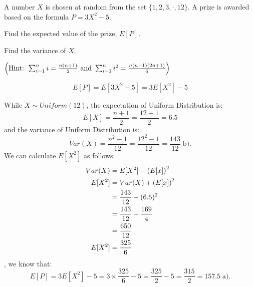 \documentclass[a4paper, 10pt]{article}
\begin{document}
\begin{tosubmit}
\problem[6]
A number \( X \) is chosen at random from the set \( \{1, 2, 3, \cdot , 12\} \).
A prize is awarded based on the formula \( P = 3X^2 - 5 \).
\begin{subproblems}
    \item Find the expected value of the prize, \( E[P] \).
    \item Find the variance of \( X \).
\end{subproblems}
\( \left(\text{Hint: } \sum_{i=1}^n i = \frac{n(n+1)}{2} \text{ and } \sum_{i=1}^n i^2 = \frac{n(n+1)(2n+1)}{6}\right) \)

\vspace{2mm}

\par\noindent\submitsolution
\[
    E[P] = E[3X^2 - 5] = 3E[X^2] - 5
\]

\vspace{2mm}

\par\noindent While \( X \sim Uniform(12) \), the expectation of Uniform Distribution is:
\[
    E[X] = \frac{n+1}{2} = \frac{12+1}{2} = 6.5
\]
and the variance of Uniform Distribution is:
\[
    Var(X) = \frac{n^2 - 1}{12} = \frac{12^2 - 1}{12} = \boxed{\frac{143}{12}} \; \text{b).}
\]
We can calculate \( E[X^2] \) as follows:
\begin{align*}    
    Var(X) &= E[X^2] - \left(E[x]\right)^2 \\
    E[X^2] &= Var(X) + \left(E[x]\right)^2 \\
    &= \frac{143}{12} + (6.5)^2 \\
    &= \frac{143}{12} + \frac{169}{4} \\
    &= \frac{650}{12} \\
    E[X^2] &= \frac{325}{6}
\end{align*}
, we know that:
\[
    E[P] = 3E[X^2] - 5 = 3 \times \frac{325}{6} - 5 = \frac{325}{2} - 5 = \frac{315}{2} = \boxed{157.5} \; \text{a).}
\]
\end{tosubmit}
\end{document}

